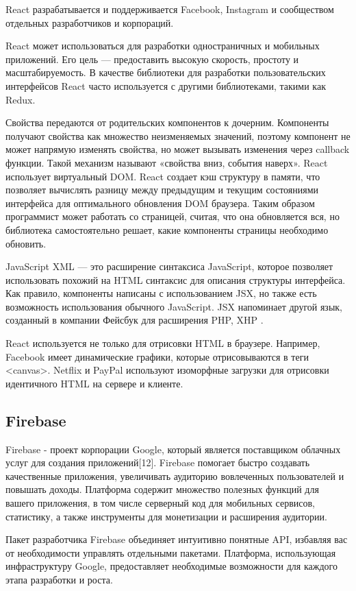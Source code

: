 React разрабатывается и поддерживается Facebook, Instagram и сообществом отдельных разработчиков и корпораций.

React может использоваться для разработки одностраничных и мобильных приложений. Его цель — предоставить высокую скорость, простоту и масштабируемость.
В качестве библиотеки для разработки пользовательских интерфейсов React часто используется с другими библиотеками, такими как Redux.

Свойства передаются от родительских компонентов к дочерним.
Компоненты получают свойства как множество неизменяемых значений, поэтому компонент не может напрямую изменять свойства, но может вызывать изменения через callback функции.
Такой механизм называют «свойства вниз, события наверх».
React использует виртуальный DOM. React создает кэш структуру в памяти, что позволяет вычислять разницу между предыдущим и текущим состояниями интерфейса для оптимального обновления DOM браузера.
Таким образом программист может работать со страницей, считая, что она обновляется вся, но библиотека самостоятельно решает, какие компоненты страницы необходимо обновить.

JavaScript XML — это расширение синтаксиса JavaScript, которое позволяет использовать похожий на HTML синтаксис для описания структуры интерфейса.
Как правило, компоненты написаны с использованием JSX, но также есть возможность использования обычного JavaScript.
JSX напоминает другой язык, созданный в компании Фейсбук для расширения PHP, XHP .

React используется не только для отрисовки HTML в браузере.
Например, Facebook имеет динамические графики, которые отрисовываются в теги <canvas>.
Netflix и PayPal используют изоморфные загрузки для отрисовки идентичного HTML на сервере и клиенте.

\subsection{Firebase}
Firebase - проект корпорации Google, который является поставщиком облачных услуг для создания приложений[12].
Firebase помогает быстро создавать качественные приложения, увеличивать аудиторию вовлеченных пользователей и повышать доходы.
Платформа содержит множество полезных функций для вашего приложения, в том числе серверный код для мобильных сервисов, статистику, а также инструменты для монетизации и расширения аудитории.

Пакет разработчика Firebase объединяет интуитивно понятные API, избавляя вас от необходимости управлять отдельными пакетами.
Платформа, использующая инфраструктуру Google, предоставляет необходимые возможности для каждого этапа разработки и роста.

